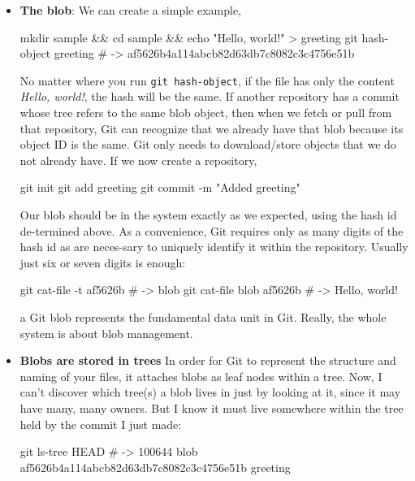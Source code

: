\documentclass{report}
\begin{document}
\begin{itemize}
        \item \textbf{The blob}: We can create a simple example,
            \bigbreak \noindent 
            \begin{bashcode}
                mkdir sample && cd sample && echo "Hello, world!" > greeting
                git hash-object greeting # -> af5626b4a114abcb82d63db7c8082c3c4756e51b
            \end{bashcode}
            \bigbreak \noindent 
            No matter where you run \texttt{git hash-object}, if the file has only the content \textit{Hello, world!}, the hash will be the same.
            \bigbreak \noindent 
            If another repository has a commit whose tree refers to the same blob object, then when we fetch or pull from that repository, Git can recognize that we already have that blob because its object ID is the same. Git only needs to download/store objects that we do not already have.
            \bigbreak \noindent 
            If we now create a repository,
            \bigbreak \noindent 
            \begin{bashcode}
                git init
                git add greeting
                git commit -m "Added greeting"
            \end{bashcode}
            \bigbreak \noindent 
            Our blob should be in the system exactly as we expected, using the hash id de-termined above. As a convenience, Git requires only as many digits of the hash id as are neces-sary to uniquely identify it within the repository. Usually just six or seven digits is enough:
            \bigbreak \noindent 
            \begin{bashcode}
                git cat-file -t af5626b # -> blob
                git cat-file blob af5626b # -> Hello, world!
            \end{bashcode}
            \bigbreak \noindent 
            a Git blob represents the fundamental data unit in Git. Really, the whole system is about blob management.
        \item \textbf{Blobs are stored in trees} In order for Git to represent the structure and naming of your files, it attaches blobs as leaf nodes within a tree. Now, I can’t discover which tree(s) a blob lives in just by looking at it, since it may have many, many owners. But I know it must live somewhere within the tree held by the commit I just made:
            \bigbreak \noindent 
            \begin{bashcode}
                git ls-tree HEAD # -> 100644 blob af5626b4a114abcb82d63db7c8082c3c4756e51b greeting

\end{bashcode}
\end{itemize}
\end{document}
